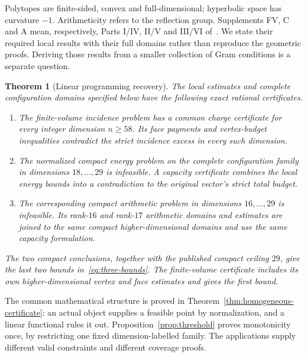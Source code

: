 \documentclass[11pt]{article}
\newtheorem{theorem}{Theorem}[section]
\theoremstyle{definition}
\theoremstyle{remark}
\numberwithin{equation}{section}
\begin{document}
Polytopes are finite-sided, convex and full-dimensional; hyperbolic
space has curvature $-1$. Arithmeticity refers to the reflection
group. Supplements FV, C and A mean, respectively, Parts I/IV, II/V
and III/VI of~\cite{BoundsSupplement}. We state their required local
results with their full domains rather than reproduce the geometric
proofs. Deriving those results from a smaller collection of Gram
conditions is a separate question.

\begin{theorem}[Linear programming recovery]
\label{thm:recovery}
The local estimates and complete configuration domains specified below
have the following exact rational certificates.
\begin{enumerate}[label=\textup{(\roman*)}]
\item The finite-volume incidence problem has a common charge
certificate for every integer dimension $n\ge58$. Its face payments
and vertex-budget inequalities contradict the strict incidence
excess in every such dimension.
\item The normalized compact energy problem on the complete
configuration family in dimensions $18,\ldots,29$ is infeasible.
A capacity certificate combines the local energy bounds into a
contradiction to the original vector's strict total budget.
\item The corresponding compact arithmetic problem in dimensions
$16,\ldots,29$ is infeasible. Its rank-$16$ and rank-$17$ arithmetic
domains and estimates are joined to the same compact
higher-dimensional domains and use the same capacity formulation.
\end{enumerate}
The two compact conclusions, together with the published compact
ceiling $29$, give the last two bounds in~\eqref{eq:three-bounds}.
The finite-volume certificate includes its own higher-dimensional
vertex and face estimates and gives the first bound.
\end{theorem}

The common mathematical structure is proved in
Theorem~\ref{thm:homogeneous-certificate}: an actual object supplies a
feasible point by normalization, and a linear functional rules it out.
Proposition~\ref{prop:threshold} proves monotonicity once, by restricting
one fixed dimension-labelled family. The applications supply different
valid constraints and different coverage proofs.
\end{document}

